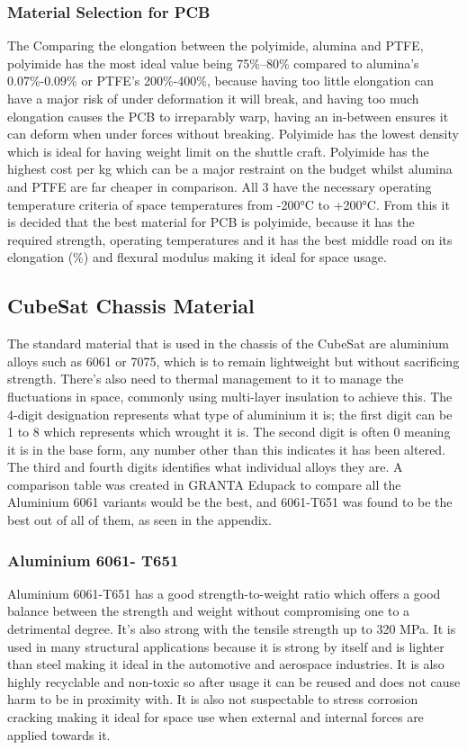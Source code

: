\subsubsection{Material Selection for PCB}
The Comparing the elongation between the polyimide, alumina and PTFE, polyimide has the most ideal value being 75\%--80\% compared to alumina's 0.07\%-0.09\% or PTFE's 200\%-400\%, because having too little elongation can have a major risk of under deformation it will break, and having too much elongation causes the PCB to irreparably warp, having an in-between ensures it can deform when under forces without breaking.
Polyimide has the lowest density which is ideal for having weight limit on the shuttle craft. 
Polyimide has the highest cost per kg which can be a major restraint on the budget whilst alumina and PTFE are far cheaper in comparison. 
All 3 have the necessary operating temperature criteria of space temperatures from -200°C to +200°C. 
From this it is decided that the best material for PCB is polyimide, because it has the required strength, operating temperatures and it has the best middle road on its elongation (\%) and flexural modulus making it ideal for space usage.

\subsection{CubeSat Chassis Material} %
The standard material that is used in the chassis of the CubeSat are aluminium alloys such as 6061 or 7075, which is to remain lightweight but without sacrificing strength. 
There's also need to thermal management to it to manage the fluctuations in space, commonly using multi-layer insulation to achieve this. 
The 4-digit designation represents what type of aluminium it is; the first digit can be 1 to 8 which represents which wrought it is. 
The second digit is often 0 meaning it is in the base form, any number other than this indicates it has been altered. 
The third and fourth digits identifies what individual alloys they are. 
A comparison table was created in GRANTA Edupack to compare all the Aluminium 6061 variants would be the best, and 6061-T651 was found to be the best out of all of them, as seen in the appendix.

\subsubsection{Aluminium 6061- T651}
Aluminium 6061-T651 has a good strength-to-weight ratio which offers a good balance between the strength and weight without compromising one to a detrimental degree. 
It's also strong with the tensile strength up to 320 MPa. 
It is used in many structural applications because it is strong by itself and is lighter than steel making it ideal in the automotive and aerospace industries. 
It is also highly recyclable and non-toxic so after usage it can be reused and does not cause harm to be in proximity with. 
It is also not suspectable to stress corrosion cracking making it ideal for space use when external and internal forces are applied towards it.

